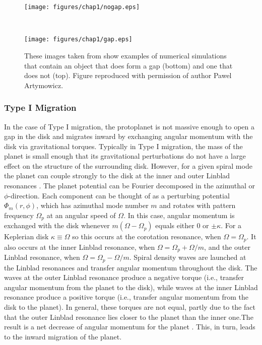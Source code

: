 \begin{figure}[p]
\centering
{}
\begin{minipage}[t]{6.3in}
\centering
\texttt{[image: figures/chap1/nogap.eps]}
\end{minipage}\\
\begin{minipage}[t]{6.3in}
\centering
\texttt{[image: figures/chap1/gap.eps]}
\end{minipage}
\caption[Examples of an object that does not form a gap and one that does]{These images taken from \citet{chambers2009} show examples of numerical simulations that contain an object that does form a gap (bottom) and one that does not (top). Figure reproduced with permission of author Pawel Artymowicz.}
\label{fig:gap}
\end{figure}

\subsubsection{Type I Migration}
In the case of Type I migration, the protoplanet is not massive enough to open a gap in the disk and migrates inward by exchanging angular momentum with the disk via gravitational torques. Typically in Type I migration, the mass of the planet is small enough that its gravitational perturbations do not have a large effect on the structure of the surrounding disk. However, for a given spiral mode the planet can couple strongly to the disk at the inner and outer Linblad resonances \citep{papaloizou2007}.  The planet potential can be Fourier decomposed in the azimuthal or $\phi$-direction. Each component can be thought of as a perturbing potential $\Phi_m(r,\phi)$, which has azimuthal mode number $m$ and rotates with pattern frequency $\Omega_p$ at an angular speed of $\Omega$. In this case, angular momentum is exchanged with the disk whenever $m(\Omega -\Omega_p)$ equals either 0 or $\pm\kappa$. For a Keplerian disk $\kappa \equiv \Omega$ so this occurs at the corotation resonance, when $\Omega = \Omega_p$. It also occurs at the inner Linblad resonance, when $\Omega = \Omega_p +\Omega/m$, and the outer Linblad resonance, when $\Omega = \Omega_p -\Omega/m$. Spiral density waves are launched at the Linblad resonances and transfer angular momentum throughout the disk. The waves at the outer Linblad resonance produce a negative torque (i.e., transfer angular momentum from the planet to the disk), while waves at the inner Linblad resonance produce a positive torque (i.e., transfer angular momentum from the disk to the planet). In general, these torques are not equal, partly due to the fact that the outer Linblad resonance lies closer to the planet than the inner one.The result is a net decrease of angular momentum for the planet \citep{papaloizou2007}. This, in turn, leads to the inward migration of the planet.

